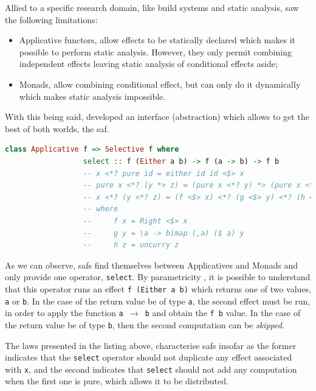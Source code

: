 \documentclass[
  oneside,
  11pt, a4paper,
  footinclude=true,
  headinclude=true,
  cleardoublepage=empty
]{scrbook}
\theoremstyle{definition}
\theoremstyle{definition}
\begin{document}
	Allied to a specific research domain, like build systems and static analysis, \cite{andrey2019selective} saw the following limitations:
	            
	            \begin{itemize}
	                \item Applicative functors, allow effects to be statically declared which makes it possible to perform static analysis. However, they only permit combining independent effects leaving static analysis of conditional effects aside;
	                \item Monads, allow combining conditional effect, but can only do it dynamically which makes static analysis impossible.
	            \end{itemize}{}
	            
	With this being said, \cite{andrey2019selective} developed an interface (abstraction) which allows to get the best of both worlds, the \gls{saf}.
	            
	            \begin{lstlisting}[language=Haskell, label={lst:saf}, caption={Selective Applicative Functor laws},captionpos=b]
	          class Applicative f => Selective f where
	              select :: f (Either a b) -> f (a -> b) -> f b
	              -- x <*? pure id = either id id <$> x
	              -- pure x <*? (y *> z) = (pure x <*? y) *> (pure x <*? z)
	              -- x <*? (y <*? z) = (f <$> x) <*? (g <$> y) <*? (h <$> z)
                  -- where
                  --     f x = Right <$> x
                  --     g y = \a -> bimap (,a) ($ a) y
                  --     h z = uncurry z
	            \end{lstlisting}{}
	            
	As we can observe, \glspl{saf} find themselves between Applicatives and Monads and only provide one operator, \texttt{select}. By parametricity \citep{Wadler:1989:TF:99370.99404}, it is possible to understand that this operator runs an effect \texttt{f (Either a b)} which returns one of two values, \texttt{a} or \texttt{b}. In the case of the return value be of type \texttt{a}, the second effect must be run, in order to apply the function \texttt{a $\rightarrow$ b} and obtain the \texttt{f b} value. In the case of the return value be of type \texttt{b}, then the second computation can be \emph{skipped}.
	            
	The laws presented in the listing above, characterise \glspl{saf} insofar as the former indicates that the \texttt{select} operator should not duplicate any effect associated with \texttt{x}, and the second indicates that \texttt{select} should not add any computation when the first one is pure, which allows it to be distributed.
	            
\end{document}

